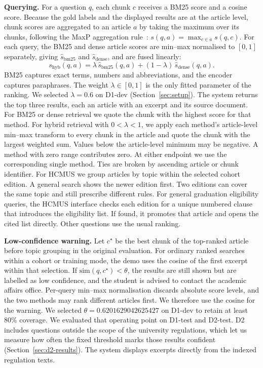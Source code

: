 \textbf{Querying.} For a question $q$, each chunk $c$ receives a BM25 score and
a cosine score. Because the gold labels and the displayed results are at the
article level, chunk scores are aggregated to an article $a$ by taking the
maximum over its chunks, following the MaxP aggregation rule~\cite{Dai_2019}:
$s(q,a)=\max_{c\in a} s(q,c)$. For each query, the BM25 and dense article
scores are min--max normalised to $[0,1]$ separately, giving $\hat{s}_{\mathrm{bm25}}$
and $\hat{s}_{\mathrm{dense}}$, and are fused linearly:
\begin{equation}
s_{\mathrm{hyb}}(q,a) = \lambda\,\hat{s}_{\mathrm{bm25}}(q,a)
  + (1-\lambda)\,\hat{s}_{\mathrm{dense}}(q,a).
\label{eq:fusion}
\end{equation}
BM25 captures exact terms, numbers and abbreviations, and the encoder captures
paraphrases. The weight $\lambda\in[0,1]$ is the only fitted parameter of the
ranking. We selected $\lambda=0.6$ on D1-dev (Section~\ref{sec:setup}).
The system returns the top three results, each an
article with an excerpt and its source document. For BM25 or dense retrieval
we quote the chunk with the highest score for that method. For hybrid retrieval
with $0<\lambda<1$, we apply each method's article-level min--max transform to
every chunk in the article and quote the chunk with the largest weighted sum.
Values below the article-level minimum may be negative. A method with zero
range contributes zero. At either endpoint we use the corresponding single
method. Ties are broken by ascending article or chunk identifier.
For HCMUS we group articles by topic within the selected cohort edition.
A general search shows the newer edition first. Two editions can cover the same topic
and still prescribe different rules. For general graduation eligibility queries,
the HCMUS interface checks each edition for a unique numbered clause that
introduces the eligibility list. If found, it promotes that article and
opens the cited list directly. Other questions use the usual ranking.

\textbf{Low-confidence warning.} Let $c^\star$ be the best chunk of the
top-ranked article before topic grouping in the original evaluation.
For ordinary ranked searches within a cohort or training mode, the demo uses the cosine
of the first excerpt within that selection. If $\mathrm{sim}(q,c^\star)<\theta$, the results are still
shown but are labelled as low confidence, and the student is advised to contact
the academic affairs office. Per-query min--max normalisation discards
absolute score levels, and the two methods may rank different articles first.
We therefore use the cosine for the warning.
We selected $\theta=0.6201629042625427$ on D1-dev to retain at least 80\% coverage.
We evaluated that operating point on D1-test and D2-test. D2 includes
questions outside the scope of the university regulations, which let us
measure how often the fixed threshold marks those results confident
(Section~\ref{sec:d2-results}). The system displays excerpts directly
from the indexed regulation texts.
